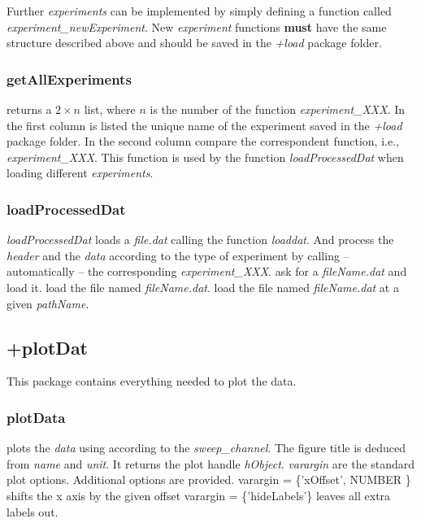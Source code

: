 Further \emph{experiments} can be implemented by simply defining a function called \emph{experiment\_newExperiment}. New \emph{experiment} functions \textbf{must} have the same structure described above and should be saved in the \emph{+load} package folder.

\subsubsection{getAllExperiments}
\bdf
{} returns a $2 \times n$ list, where $n$ is the number of the function \emph{experiment\_XXX}.
In the first column is listed the unique name of the experiment saved in the \emph{+load} package folder.
In the second column compare the correspondent function, i.e., \emph{experiment\_XXX}.
\edf
This function is used by the function \emph{loadProcessedDat} when loading different \emph{experiments}.

\subsubsection{loadProcessedDat}
\emph{loadProcessedDat} loads a \emph{file.dat} calling the function \emph{loaddat}.
And process the \emph{header} and the \emph{data} according to the type of experiment by calling -- automatically -- the corresponding \emph{experiment\_XXX}.
\bdf
{} ask for a \emph{fileName.dat} and load it.
 load the file named \emph{fileName.dat}.
 load the file named \emph{fileName.dat} at a given \emph{pathName}.
\edf

\subsection{+plotDat}
This package contains everything needed to plot the data.
\subsubsection{plotData}
\bdf
{} plots the \emph{data} using according to the \emph{sweep\_channel}. The figure title is deduced from \emph{name} and \emph{unit}. It returns the plot handle \emph{hObject}. \emph{varargin} are the standard plot options. Additional options are provided.
\bi
\+ varargin = \{'xOffset', NUMBER \} shifts the x axis by the given offset
\+ varargin = \{'hideLabels'\} leaves all extra labels out.
\ei
\edf
